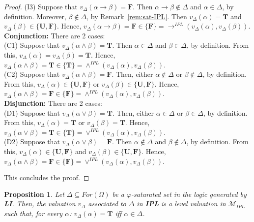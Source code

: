 \documentclass[12pt]{article}
\newtheorem{proposition}[theorem]{Proposition}
\newcommand{\bT}{\mathbf{T}}
\newcommand{\bU}{\mathbf{U}}
\newcommand{\bF}{\mathbf{F}}
\begin{document}
\begin{proof}
(I3)  Suppose that $v_\Delta(\alpha \to \beta)=\bF$. Then $\alpha \to \beta \notin \Delta$ and $\alpha \in\Delta$, by definition. Moreover, $\beta \notin\Delta$, by Remark~\ref{rem:sat-IPL}. Then $v_\Delta(\alpha) =\bT$ and  $v_\Delta(\beta) \in \{\bU,\bF\}$. Hence, $v_\Delta(\alpha \to \beta)=\bF \in \{\bF\}={\to}^{IPL}(v_\Delta(\alpha),v_\Delta(\beta))$.\\[1mm]
{\bf Conjunction:} There are 2 cases:\\
(C1) Suppose that $v_\Delta(\alpha \land \beta)=\bT$. Then  $\alpha \in \Delta$ and  $\beta \in\Delta$, by definition. From this, $v_\Delta(\alpha)=v_\Delta(\beta)=\bT$. Hence, $v_\Delta(\alpha \land \beta)=\bT \in \{\bT\}= \land^{IPL}(v_\Delta(\alpha),v_\Delta(\beta))$.\\
(C2)  Suppose that $v_\Delta(\alpha \land \beta)=\bF$. Then, either  $\alpha \notin \Delta$ or  $\beta \notin\Delta$, by definition. From this, $v_\Delta(\alpha)  \in \{\bU,\bF\}$ or $v_\Delta(\beta)  \in \{\bU,\bF\}$. Hence, $v_\Delta(\alpha \land \beta)=\bF \in \{\bF\}= \land^{IPL}(v_\Delta(\alpha),v_\Delta(\beta))$.\\[1mm]
{\bf Disjunction:} There are 2 cases:\\
(D1)  Suppose that $v_\Delta(\alpha \vee \beta)=\bT$. Then, either  $\alpha \in \Delta$ or  $\beta \in\Delta$, by definition. From this, $v_\Delta(\alpha)=\bT$ or $v_\Delta(\beta)=\bT$. Hence, $v_\Delta(\alpha \vee \beta)=\bT \in \{\bT\}= \vee^{IPL}(v_\Delta(\alpha),v_\Delta(\beta))$.\\
(D2) Suppose that $v_\Delta(\alpha \vee \beta)=\bF$. Then  $\alpha \notin \Delta$ and  $\beta \notin\Delta$, by definition. From this, $v_\Delta(\alpha)  \in \{\bU,\bF\}$ and $v_\Delta(\beta)  \in \{\bU,\bF\}$. Hence, $v_\Delta(\alpha \land \beta)=\bF \in \{\bF\}= \vee^{IPL}(v_\Delta(\alpha),v_\Delta(\beta))$.

This concludes the proof.
\end{proof}


\begin{proposition} \label{prop:val-Delta-IPL-level}
Let $\Delta \subseteq For(\Omega)$ be a $\varphi$-saturated set in the logic generated by {\bf LI}. Then, the valuation $v_\Delta$ associated to $\Delta$ in \textbf{IPL} is a  level valuation in $\mathcal{M}_{IPL}$ such that, for every $\alpha$: $v_\Delta(\alpha)=\bT$ iff $\alpha \in \Delta$.
\end{proposition}
\end{document}
